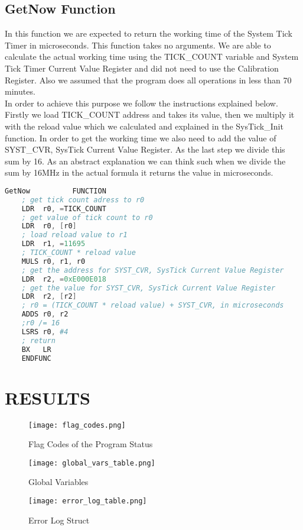 \documentclass[pdftex,12pt,a4paper]{article}
\begin{document}
\subsection{GetNow Function}
In this function we are expected to return the working time of the System Tick Timer in microseconds. This function takes no arguments. We are able to calculate the actual working time using the TICK\_COUNT variable and System Tick Timer Current Value Register and did not need to use the Calibration Register. Also we assumed that the program does all operations in less than 70 minutes.\\ 

In order to achieve this purpose we follow the instructions explained below. \\

Firstly we load TICK\_COUNT address and takes its value, then we multiply it with the reload value which we calculated and explained in the SysTick\_Init function. In order to get the working time we also need to add the value of SYST\_CVR, SysTick Current Value Register. As the last step we divide this sum by 16. As an abstract explanation we can think such when we divide the sum by 16MHz in the actual formula it returns the value in microseconds. \\
\begin{lstlisting}[language=Assembler]
GetNow			FUNCTION			
	; get tick count adress to r0
	LDR  r0, =TICK_COUNT		
	; get value of tick count to r0
	LDR  r0, [r0]			   
	; load reload value to r1
	LDR  r1, =11695         
	; TICK_COUNT * reload value
	MULS r0, r1, r0         
	; get the address for SYST_CVR, SysTick Current Value Register
	LDR  r2, =0xE000E018          
	; get the value for SYST_CVR, SysTick Current Value Register 
	LDR  r2, [r2]                 
	; r0 = (TICK_COUNT * reload value) + SYST_CVR, in microseconds
	ADDS r0, r2             
	;r0 /= 16
	LSRS r0, #4				
	; return
	BX   LR                 
	ENDFUNC
\end{lstlisting}

\section{RESULTS}
\begin{figure}[H]
	\centering
	\texttt{[image: flag\_codes.png]}
	\caption{Flag Codes of the Program Status}
	\label{}
\end{figure}
\begin{figure}[H]
	\centering
	\texttt{[image: global\_vars\_table.png]}
	\caption{Global Variables}
	\label{}
\end{figure}
\begin{figure}[H]
	\centering
	\texttt{[image: error\_log\_table.png]}
	\caption{Error Log Struct}
	\label{}
\end{figure}
\end{document}
